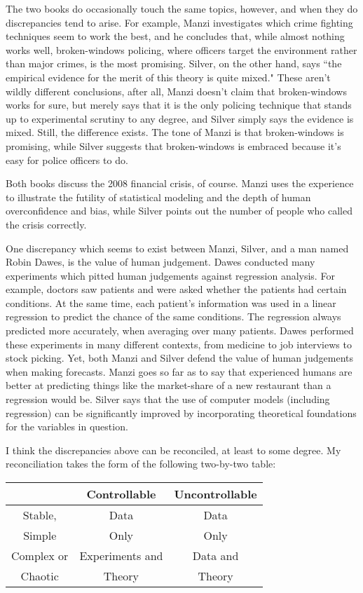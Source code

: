 \documentclass[11pt, oneside]{article}   	%
\begin{document}
The two books do occasionally touch the same topics, however, and when they do discrepancies tend to arise.  For example, Manzi investigates which crime fighting techniques seem to work the best, and he concludes that, while almost nothing works well, broken-windows policing, where officers target the environment rather than major crimes, is the most promising.  Silver, on the other hand, says ``the empirical evidence for the merit of this theory is quite mixed."  These aren't wildly different conclusions, after all, Manzi doesn't claim that broken-windows works for sure, but merely says that it is the only policing technique that stands up to experimental scrutiny to any degree, and Silver simply says the evidence is mixed.  Still, the difference exists.  The tone of Manzi is that broken-windows is promising, while Silver suggests that broken-windows is embraced because it's easy for police officers to do.  

Both books discuss the 2008 financial crisis, of course.  Manzi uses the experience to illustrate the futility of statistical modeling and the depth of human overconfidence and bias, while Silver points out the number of people who called the crisis correctly.  

One discrepancy which seems to exist between Manzi, Silver, and a man named Robin Dawes, is the value of human judgement.  Dawes conducted many experiments which pitted human judgements against regression analysis.  For example, doctors saw patients and were asked whether the patients had certain conditions.  At the same time, each patient's information was used in a linear regression to predict the chance of the same conditions.  The regression always predicted more accurately, when averaging over many patients.  Dawes performed these experiments in many different contexts, from medicine to job interviews to stock picking.  Yet, both Manzi and Silver defend the value of human judgements when making forecasts.  Manzi goes so far as to say that experienced humans are better at predicting things like the market-share of a new restaurant than a regression would be.  Silver says that the use of computer models (including regression) can be significantly improved by incorporating theoretical foundations for the variables in question.

I think the discrepancies above can be reconciled, at least to some degree.  My reconciliation takes the form of the following two-by-two table:

\begin{center}
\begin{tabular}{c|c|c|}
&Controllable & Uncontrollable  \\
\hline
Stable, & Data  & Data \\
Simple & Only & Only \\
\hline
Complex or & Experiments and   & Data and   \\
Chaotic &Theory & Theory \\
\hline
\end{tabular}
\end{center}
\end{document}
